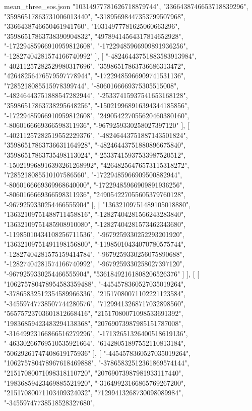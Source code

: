 \begin{filecontents*}[overwrite]{mean_three_sos.json}
    "10314977781626718879744",
    "3366438746653718839296",
    "35986517863731006013440",
    "-31895698447353799507968",
    "3366438746650461941760",
    "10314977781625060663296",
    "35986517863738390904832",
    "49789414564317814652928",
    "-17229485966910959812608",
    "-17229485966909891936256",
    "-12827404281574166740992"
   ],
   [
    "-48246443751883583913984",
    "-40211257282529980317696",
    "35986517863736686313472",
    "42648256476579597778944",
    "-17229485966909741531136",
    "7285218085515978399744",
    "-8060166669375305515008",
    "-48246443751888547282944",
    "-25337415937541653168128",
    "35986517863738295648256",
    "-150219968916394344185856",
    "-17229485966910959812608",
    "249054227055620460380160",
    "-8060166669366598311936",
    "-9679259330258027397120"
   ],
   [
    "-40211257282519552229376",
    "-48246443751887143501824",
    "35986517863736631164928",
    "-48246443751880896675840",
    "35986517863735498113024",
    "-25337415937533987520512",
    "-150219968916393261268992",
    "42648256476573115318272",
    "7285218085510107586560",
    "-17229485966909500882944",
    "-8060166669369968640000",
    "-17229485966909891936256",
    "-8060166669366598311936",
    "249054227055605379760128",
    "-9679259330254466555904"
   ],
   [
    "13632109751489105018880",
    "13632109751488711458816",
    "-12827404281566243283840",
    "13632109751485908910080",
    "-12827404281573462343680",
    "-11985010434108256711536",
    "-9679259330252293201920",
    "13632109751491198156800",
    "-11985010434070780575744",
    "-12827404281575159414784",
    "-9679259330256075890688",
    "-12827404281574166740992",
    "-9679259330258027397120",
    "-9679259330254466555904",
    "53618492161808206526376"
   ]
  ],
  [
   [
    "106275780478954583359488",
    "-4454578360527035019264",
    "-37865832512354589966336",
    "21517080071102221123584",
    "-34559747738507744280576",
    "71299413268717032898560",
    "56575723703601812668416",
    "21517080071098533691392",
    "19836859423483294138368",
    "20769073987985151787008",
    "-31649923166866516279296",
    "-17132651326400518619136",
    "-46330266769510535921664",
    "61428051897552110813184",
    "50629261747408619175936"
   ],
   [
    "-4454578360527035019264",
    "106275780478967618469888",
    "-37865832512361869574144",
    "21517080071098318110720",
    "20769073987981933117440",
    "19836859423469885521920",
    "-31649923166865769267200",
    "21517080071103409324032",
    "71299413268730098089984",
    "-34559747738518528327680",

\end{filecontents*}
